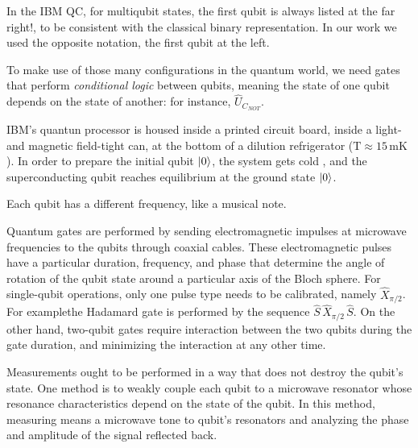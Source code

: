 \documentclass[11pt]{article}
\numberwithin{equation}{section} %
\numberwithin{figure}{section} %
\begin{document}
\begin{appendices}
In the IBM QC, for multiqubit states,  the first qubit is always listed at the far right!, to be consistent with the classical binary representation. In our work we used the opposite notation, the first qubit at the left. 

To make use of those many configurations in the quantum world, we need gates that perform \emph{conditional logic} between qubits, meaning the state of one qubit depends on the state of another: for instance, $\hat{U}_{C_{NOT}}$.


IBM's quantun processor is housed inside a printed circuit board, inside a light- and magnetic field-tight can, at the bottom of a dilution refrigerator ($\textrm{T}\approx 15\,\textrm{mK}$). In order to prepare the initial qubit $\ket{0}$, the  system gets cold , and the superconducting qubit reaches equilibrium at the ground state $\ket{0}$.

Each qubit has a different frequency, like a musical note.

Quantum gates are performed by sending electromagnetic impulses at microwave frequencies to the qubits through coaxial cables. These electromagnetic pulses have a particular duration, frequency, and phase that determine the angle of rotation of the qubit state around a particular axis of the Bloch sphere.  For single-qubit operations, only one pulse type needs to be calibrated, namely $\hat{X}_{\pi/2}$. For examplethe Hadamard gate is performed by the sequence $\hat{S}\,\hat{X}_{\pi/2}\,\hat{S}$. On the other hand, two-qubit gates require interaction between the two qubits during the gate duration, and minimizing the interaction at any other time.

Measurements ought to be performed in a way that does not destroy the qubit's state. One method is to weakly couple each qubit to a microwave resonator whose resonance characteristics depend on the state of the qubit. In this method, measuring means a microwave tone to qubit's resonators and analyzing the phase and amplitude of the signal reflected back.














\end{appendices}







    
\renewcommand{\refname}{Bibliography}
\end{document}
